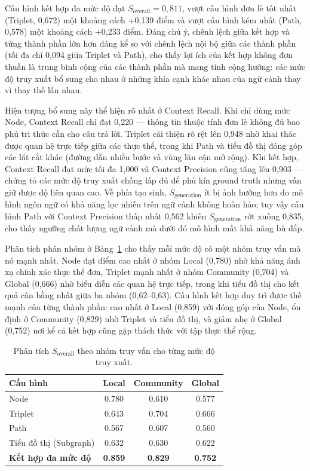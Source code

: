 Cấu hình kết hợp đa mức độ đạt $S_{\text{overall}} = 0{,}811$, vượt cấu hình đơn lẻ tốt nhất (Triplet, 0,672) một khoảng cách +0,139 điểm và vượt cấu hình kém nhất (Path, 0,578) một khoảng cách +0,233 điểm. Đáng chú ý, chênh lệch giữa kết hợp và từng thành phần lớn hơn đáng kể so với chênh lệch nội bộ giữa các thành phần (tối đa chỉ 0,094 giữa Triplet và Path), cho thấy lợi ích của kết hợp không đơn thuần là trung bình cộng của các thành phần mà mang tính cộng hưởng: các mức độ truy xuất bổ sung cho nhau ở những khía cạnh khác nhau của ngữ cảnh thay vì thay thế lẫn nhau.

Hiện tượng bổ sung này thể hiện rõ nhất ở Context Recall. Khi chỉ dùng mức Node, Context Recall chỉ đạt 0,220 --- thông tin thuộc tính đơn lẻ không đủ bao phủ tri thức cần cho câu trả lời. Triplet cải thiện rõ rệt lên 0,948 nhờ khai thác được quan hệ trực tiếp giữa các thực thể, trong khi Path và tiểu đồ thị đóng góp các lát cắt khác (đường dẫn nhiều bước và vùng lân cận mở rộng). Khi kết hợp, Context Recall đạt mức tối đa 1,000 và Context Precision cũng tăng lên 0,903 --- chứng tỏ các mức độ truy xuất chồng lấp đủ để phủ kín ground truth nhưng vẫn giữ được độ liên quan cao. Về phía tạo sinh, $S_{\text{generation}}$ ít bị ảnh hưởng hơn do mô hình ngôn ngữ có khả năng lọc nhiễu trên ngữ cảnh không hoàn hảo; tuy vậy cấu hình Path với Context Precision thấp nhất 0,562 khiến $S_{\text{generation}}$ rớt xuống 0,835, cho thấy ngưỡng chất lượng ngữ cảnh mà dưới đó mô hình mất khả năng bù đắp.

Phân tích phân nhóm ở Bảng~\ref{tab:granularity_by_category} cho thấy mỗi mức độ có một nhóm truy vấn mà nó mạnh nhất. Node đạt điểm cao nhất ở nhóm Local (0,780) nhờ khả năng ánh xạ chính xác thực thể đơn, Triplet mạnh nhất ở nhóm Community (0,704) và Global (0,666) nhờ biểu diễn các quan hệ trực tiếp, trong khi tiểu đồ thị cho kết quả cân bằng nhất giữa ba nhóm (0,62--0,63). Cấu hình kết hợp duy trì được thế mạnh của từng thành phần: cao nhất ở Local (0,859) với đóng góp của Node, ổn định ở Community (0,829) nhờ Triplet và tiểu đồ thị, và giảm nhẹ ở Global (0,752) nơi kể cả kết hợp cũng gặp thách thức với tập thực thể rộng.

\begin{table}[h]
\centering
\caption{Phân tích $S_{\text{overall}}$ theo nhóm truy vấn cho từng mức độ truy xuất.}
\label{tab:granularity_by_category}
\begin{tabular}{lccc}
\hline
\textbf{Cấu hình} & \textbf{Local} & \textbf{Community} & \textbf{Global} \\
\hline
Node                       & 0.780 & 0.610 & 0.577 \\
Triplet                    & 0.643 & 0.704 & 0.666 \\
Path                       & 0.567 & 0.607 & 0.560 \\
Tiểu đồ thị (Subgraph)     & 0.632 & 0.630 & 0.622 \\
\textbf{Kết hợp đa mức độ} & \textbf{0.859} & \textbf{0.829} & \textbf{0.752} \\
\hline
\end{tabular}
\end{table}

